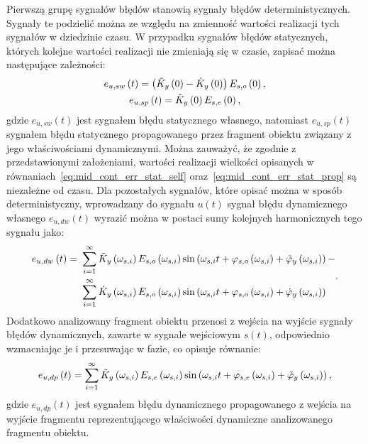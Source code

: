 Pierwszą grupę sygnałów błędów stanowią sygnały błędów deterministycznych. Sygnały te podzielić można ze względu na zmienność wartości realizacji tych sygnałów w dziedzinie czasu. W przypadku sygnałów błędów statycznych, których kolejne wartości realizacji nie zmieniają się w czasie, zapisać można następujące zależności:
\begin{gather}
e_{u,sw} \left(t\right) = \left( \tilde{K}_{y} \left(0\right) - \dot{K}_{y} \left(0\right) \right) E_{s,o} \left(0\right) \label{eq:mid_cont_err_stat_self}, \\
e_{u,sp} \left(t\right) = \tilde{K}_{y} \left(0\right) E_{s,e} \left(0\right) \label{eq:mid_cont_err_stat_prop},
\end{gather}
gdzie $e_{u,sw}(t)$ jest sygnałem błędu statycznego własnego, natomiast $e_{u,sp}(t)$ sygnałem błędu statycznego propagowanego przez fragment obiektu związany z jego właściwościami dynamicznymi. Można zauważyć, że zgodnie z przedstawionymi założeniami, wartości realizacji wielkości opisanych w równaniach~\eqref{eq:mid_cont_err_stat_self} oraz~\eqref{eq:mid_cont_err_stat_prop} są niezależne od czasu. Dla pozostałych sygnałów, które opisać można w sposób deterministyczny, wprowadzany do sygnału $u(t)$ sygnał błędu dynamicznego własnego $e_{u,dw}(t)$ wyrazić można w postaci sumy kolejnych harmonicznych tego sygnału jako:
\begin{equation}
\begin{split}
e_{u,dw} \left(t\right) =~
& \sum _{i = 1} ^{\infty} \tilde{K}_{y} \left(\omega_{s,i}\right) E_{s,o} \left(\omega_{s,i}\right) \sin \left( \omega_{s,i} t + \varphi_{s,o} \left(\omega_{s,i}\right) + \tilde{\varphi}_{y} \left(\omega_{s,i}\right) \right) - \\
& \sum _{i = 1} ^{\infty} \dot{K}_{y} \left(\omega_{s,i}\right) E_{s,o} \left(\omega_{s,i}\right) \sin \left( \omega_{s,i} t + \varphi_{s,o} \left(\omega_{s,i}\right) + \dot{\varphi}_{y} \left(\omega_{s,i}\right) \right)
\end{split}
\label{eq:mid_cont_err_dyn_self}.
\end{equation}
Dodatkowo analizowany fragment obiektu przenosi z wejścia na wyjście sygnały błędów dynamicznych, zawarte w sygnale wejściowym $s(t)$, odpowiednio wzmacniając je i przesuwając w fazie, co opisuje równanie:
\begin{equation}
e_{u,dp} \left(t\right) = \sum _{i = 1} ^{\infty} \tilde{K}_{y} \left(\omega_{s,i}\right) E_{s,e} \left(\omega_{s,i}\right) \sin \left( \omega_{s,i} t + \varphi_{s,e} \left(\omega_{s,i}\right) + \tilde{\varphi}_{y} \left(\omega_{s,i}\right) \right) \label{eq:mid_cont_err_dyn_prop},
\end{equation}
gdzie $e_{u,dp}(t)$ jest sygnałem błędu dynamicznego propagowanego z wejścia na wyjście fragmentu reprezentującego właściwości dynamiczne analizowanego fragmentu obiektu.

